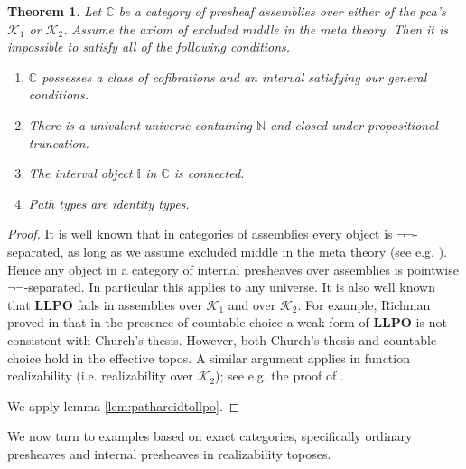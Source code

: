 \documentclass[a4paper]{amsart}
\newtheorem{theorem}{Theorem}[section]
\theoremstyle{definition}
\newcommand{\cat}[1]{\mathbb{#1}}
\newcommand{\catc}{\cat{C}}
\newcommand{\intv}{\mathbb{I}}
\newcommand{\nat}{\mathbb{N}}
\newcommand{\llpo}{\mathbf{LLPO}}
\newcommand{\klone}{\mathcal{K}_1}
\newcommand{\kltwo}{\mathcal{K}_2}
\begin{document}
\begin{theorem}
  Let $\catc$ be a category of presheaf assemblies over either of the
  pca's $\klone$ or $\kltwo$. Assume the axiom of excluded middle in
  the meta theory. Then it is impossible to satisfy all of
  the following conditions.

  \begin{enumerate}
  \item $\catc$ possesses a class of cofibrations and an interval
    satisfying our general conditions.
  \item There is a univalent universe containing $\nat$ and closed
    under propositional truncation.
  \item The interval object $\intv$ in $\catc$ is connected.
  \item Path types are identity types.
  \end{enumerate}
\end{theorem}

\begin{proof}
  It is well known that in categories of assemblies every object is
  $\neg \neg$-separated, as long as we assume excluded middle in the
  meta theory (see e.g. \cite[Section 3.1]{vanoosten}).
  Hence any object in a category of internal presheaves over
  assemblies is pointwise $\neg \neg$-separated. In particular this
  applies to any universe.
  It is also well known that $\llpo$ fails in assemblies over
  $\klone$ and over $\kltwo$. For example, Richman proved in
  \cite[Theorem 5]{richmanllpon} that in the presence of countable
  choice a weak form of $\llpo$ is not consistent with Church's
  thesis. However, both Church's thesis and countable choice hold in
  the effective topos. A similar argument applies in function
  realizability (i.e. realizability over $\kltwo$); see
  e.g. the proof of \cite[Corollary 7.23]{rathjenswanlif}.

  We apply lemma \ref{lem:pathareidtollpo}.
\end{proof}

We now turn to examples based on exact categories, specifically
ordinary presheaves and internal presheaves in realizability toposes.
\end{document}
